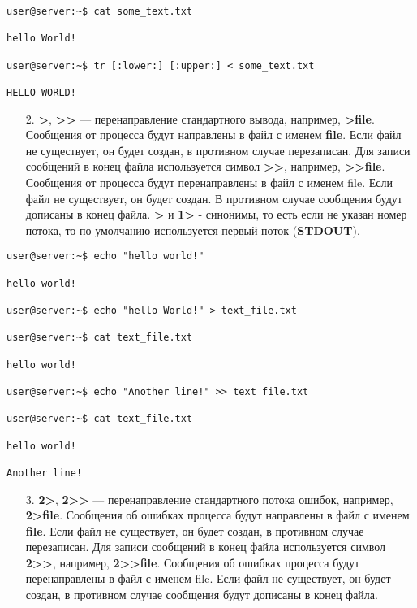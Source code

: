 \documentclass[14pt, a4paper]{article}
\begin{document}
\begin{lstlisting}
user@server:~$ cat some_text.txt
            
hello World!
            
user@server:~$ tr [:lower:] [:upper:] < some_text.txt
            
HELLO WORLD!
\end{lstlisting}

\begin{enumerate}
    \item[2.] \textbf{>}, \textbf{>}\textbf{>} — перенаправление стандартного вывода, например, \textbf{>file}. Сообщения от процесса
    будут направлены в файл с именем \textbf{file}. Если файл не существует, он будет создан, в
    противном случае перезаписан. Для записи сообщений в конец файла используется символ
    \textbf{>}\textbf{>}, например, \textbf{>}\textbf{>}\textbf{file}. Сообщения от процесса будут перенаправлены в файл с именем file.
    Если файл не существует, он будет создан. В противном случае сообщения будут дописаны в
    конец файла. \textbf{>} и \textbf{1>} - синонимы, то есть если не указан номер потока, то по умолчанию
    используется первый поток (\textbf{STDOUT}).
\end{enumerate}

\begin{lstlisting}
user@server:~$ echo "hello world!"

hello world!

user@server:~$ echo "hello World!" > text_file.txt

user@server:~$ cat text_file.txt

hello world!

user@server:~$ echo "Another line!" >> text_file.txt

user@server:~$ cat text_file.txt

hello world!

Another line!
\end{lstlisting}

\begin{enumerate}
    \item[3.] \textbf{2>}, \textbf{2>}\textbf{>} — перенаправление стандартного потока ошибок, например, \textbf{2>file}. Сообщения об
    ошибках процесса будут направлены в файл с именем \textbf{file}. Если файл не существует, он будет
    создан, в противном случае перезаписан. Для записи сообщений в конец файла используется
    символ \textbf{2>}\textbf{>}, например, \textbf{2>}\textbf{>}\textbf{file}. Сообщения об ошибках процесса будут перенаправлены в
    файл с именем file. Если файл не существует, он будет создан, в противном случае сообщения
    будут дописаны в конец файла.
\end{enumerate}
\end{document}
